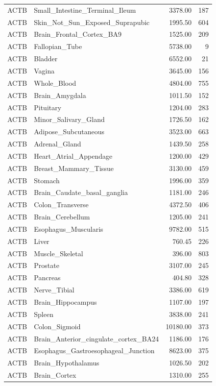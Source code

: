 \begin{footnotesize}
\begin{longtable}{llrr}
ACTB & Small\_Intestine\_Terminal\_Ileum & 3378.00 & 187 \\
ACTB & Skin\_Not\_Sun\_Exposed\_Suprapubic & 1995.50 & 604 \\
ACTB & Brain\_Frontal\_Cortex\_BA9 & 1525.00 & 209 \\
ACTB & Fallopian\_Tube & 5738.00 & 9 \\
ACTB & Bladder & 6552.00 & 21 \\
ACTB & Vagina & 3645.00 & 156 \\
ACTB & Whole\_Blood & 4804.00 & 755 \\
ACTB & Brain\_Amygdala & 1011.50 & 152 \\
ACTB & Pituitary & 1204.00 & 283 \\
ACTB & Minor\_Salivary\_Gland & 1726.50 & 162 \\
ACTB & Adipose\_Subcutaneous & 3523.00 & 663 \\
ACTB & Adrenal\_Gland & 1439.50 & 258 \\
ACTB & Heart\_Atrial\_Appendage & 1200.00 & 429 \\
ACTB & Breast\_Mammary\_Tissue & 3130.00 & 459 \\
ACTB & Stomach & 1996.00 & 359 \\
ACTB & Brain\_Caudate\_basal\_ganglia & 1181.00 & 246 \\
ACTB & Colon\_Transverse & 4372.50 & 406 \\
ACTB & Brain\_Cerebellum & 1205.00 & 241 \\
ACTB & Esophagus\_Muscularis & 9782.00 & 515 \\
ACTB & Liver & 760.45 & 226 \\
ACTB & Muscle\_Skeletal & 396.00 & 803 \\
ACTB & Prostate & 3107.00 & 245 \\
ACTB & Pancreas & 404.80 & 328 \\
ACTB & Nerve\_Tibial & 3386.00 & 619 \\
ACTB & Brain\_Hippocampus & 1107.00 & 197 \\
ACTB & Spleen & 3838.00 & 241 \\
ACTB & Colon\_Sigmoid & 10180.00 & 373 \\
ACTB & Brain\_Anterior\_cingulate\_cortex\_BA24 & 1186.00 & 176 \\
ACTB & Esophagus\_Gastroesophageal\_Junction & 8623.00 & 375 \\
ACTB & Brain\_Hypothalamus & 1026.50 & 202 \\
ACTB & Brain\_Cortex & 1310.00 & 255 \\

\end{longtable}
\end{footnotesize}
